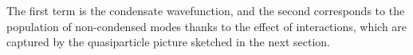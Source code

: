 
	The first term is the condensate wavefunction, and the second corresponds to the population of non-condensed modes thanks to the effect of interactions, which are captured by the quasiparticle picture sketched in the next section.	

